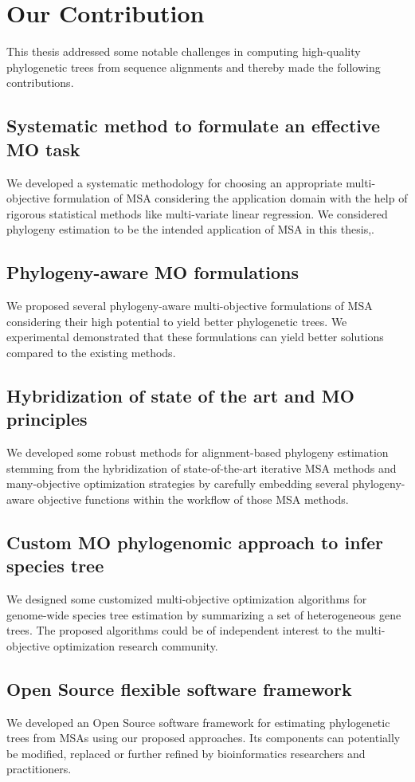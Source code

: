 \section{Our Contribution}
This thesis addressed some notable challenges in computing high-quality phylogenetic trees from sequence alignments and thereby made the following contributions.

\subsection{Systematic method to formulate an effective MO task}
 We developed a systematic methodology for choosing an appropriate multi-objective formulation of MSA considering the application domain with the help of rigorous statistical methods like multi-variate linear regression. We considered phylogeny estimation to be the intended application of MSA in this thesis,.

\subsection{Phylogeny-aware MO formulations}
 We proposed several phylogeny-aware multi-objective formulations of MSA considering their high potential to yield better phylogenetic trees. We experimental demonstrated that these formulations can yield better solutions compared to the existing methods.

\subsection{Hybridization of state of the art and MO principles}
 We developed some robust methods for alignment-based phylogeny estimation stemming from the hybridization of state-of-the-art iterative MSA methods and many-objective optimization strategies by carefully embedding several phylogeny-aware objective functions within the workflow of those MSA methods. 

\subsection{Custom MO phylogenomic approach to infer species tree}
 We designed some customized multi-objective optimization algorithms for genome-wide species tree estimation by summarizing a set of heterogeneous gene trees. The proposed algorithms could be of independent interest to the multi-objective optimization research community.

\subsection{Open Source flexible software framework}
 We developed an Open Source software framework for estimating phylogenetic trees from MSAs using our proposed approaches. Its components can potentially be modified, replaced or further refined by bioinformatics researchers and practitioners.

